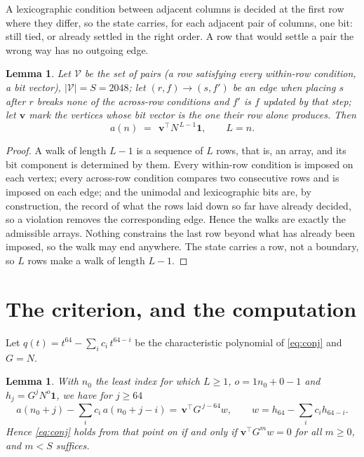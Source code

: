 \documentclass[11pt,a4paper]{article}
\theoremstyle{plain}
\newtheorem{lemma}[theorem]{Lemma}
\theoremstyle{definition}
\begin{document}
A lexicographic condition between adjacent columns is decided
at the first row where they differ, so the state carries, for each adjacent pair of
columns, one bit: still tied, or already settled in the right order. A row that would
settle a pair the wrong way has no outgoing edge.

\begin{lemma}\label{lem:walk}
Let $\mathcal V$ be the set of pairs (a row satisfying every within-row condition, a
bit vector), $|\mathcal V|=S=2048$; let $(r,f)\to(s,f')$ be an edge when placing $s$ after $r$
breaks none of the across-row conditions and $f'$ is $f$ updated by that step; let
$\mathbf{v}$ mark the vertices whose bit vector is the one their row alone produces.
Then
\[
a(n)\;=\;\,\mathbf{v}^{\!\top}N^{\,L-1}\mathbf{1},\qquad L=n.
\]
\end{lemma}

\begin{proof}
A walk of length $L-1$ is a sequence of $L$ rows, that is, an array, and its bit component
is determined by them. Every within-row condition is imposed on each vertex; every
across-row condition compares two consecutive rows and is imposed on each edge; and the
unimodal and lexicographic bits are, by construction, the record of what the rows laid down
so far have already decided, so a violation removes the corresponding edge. Hence the walks
are exactly the admissible arrays. Nothing constrains the last row beyond what has already
been imposed, so the walk may end anywhere. The state carries a row, not a boundary, so
$L$ rows make a walk of length $L-1$.
\end{proof}

\section{The criterion, and the computation}

Let $q(t)=t^{64}-\sum_i c_i\,t^{64-i}$ be the characteristic polynomial of
\eqref{eq:conj} and $G=N$.

\begin{lemma}\label{lem:crit}
With $n_0$ the least index for which $L\ge1$, $o=1n_0+0-1$ and
$h_j=G^{j}N^{o}\mathbf{1}$, we have for $j\ge64$
\[
a(n_0+j)-\sum_i c_i\,a(n_0+j-i)=\,\mathbf{v}^{\!\top}G^{\,j-64}w,
\qquad w=h_{64}-\sum_i c_ih_{64-i} .
\]
Hence \eqref{eq:conj} holds from that point on if and only if
$\mathbf{v}^{\!\top}G^{m}w=0$ for all $m\ge0$, and $m<S$ suffices.
\end{lemma}
\end{document}
